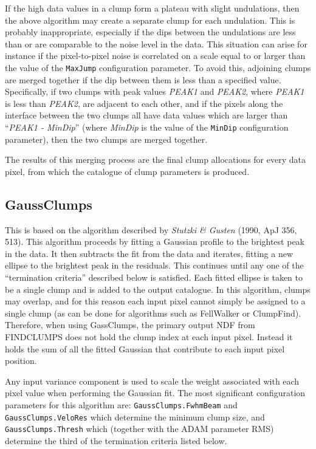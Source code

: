 \documentclass[twoside,11pt]{starlink}
\begin{document}
If the high data values in a clump form a plateau with slight
undulations, then the above algorithm may create a separate clump for
each undulation. This is probably inappropriate, especially if the dips
between the undulations are less than or are comparable to the noise
level in the data. This situation can arise for instance if the
pixel-to-pixel noise is correlated on a scale equal to or larger than the
value of the \texttt{MaxJump} configuration parameter. To avoid this, adjoining
clumps are merged together if the dip between them is less than a
specified value. Specifically, if two clumps with peak values \emph{PEAK1}
and  \emph{PEAK2}, where \emph{PEAK1} is less than \emph{PEAK2}, are
adjacent to each other, and if the pixels along the interface between the
two clumps all have data values which are larger than ``\emph{PEAK1 - MinDip}''
(where \emph{MinDip} is the value of the \texttt{MinDip} configuration
parameter), then the two clumps are merged together.

The results of this merging process are the final clump allocations for
every data pixel, from which the catalogue of clump parameters is
produced.

\subsection{GaussClumps}

This is based on the algorithm described by \emph{Stutzki \& Gusten}
(1990, ApJ 356, 513). This algorithm proceeds by fitting a Gaussian
profile to the brightest peak in the data. It then subtracts the fit from
the data and iterates, fitting a new ellipse to the brightest peak in the
residuals. This continues until any one of the ``termination criteria''
described below is satisfied. Each fitted ellipse is taken to be a single
clump and is added to the output catalogue. In this algorithm, clumps may
overlap, and for this reason each input pixel cannot simply be assigned
to a single clump (as can be done for algorithms such as FellWalker or
ClumpFind). Therefore, when using GassClumps, the primary output NDF from
FINDCLUMPS does not hold the clump index at each input pixel. Instead it
holds the sum of all the fitted Gaussian that contribute to each input
pixel position.

Any input variance component is used to scale the weight associated with
each pixel value when performing the Gaussian fit. The most significant
configuration parameters for this algorithm are:
\texttt{GaussClumps.FwhmBeam} and \texttt{GaussClumps.VeloRes} which determine the
minimum clump size, and \texttt{GaussClumps.Thresh} which (together with the
ADAM parameter RMS) determine the third of the termination
criteria listed below.
\end{document}
